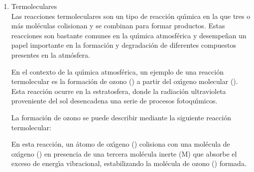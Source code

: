 \begin{enumerate}
La reacci\'on de segundo orden entre los \'oxidos de nitr\'ogeno y el ozono es importante en la qu\'{\i}mica atmosf\'erica, ya que contribuye a la formaci\'on de oxidantes fotoqu\'{\i}micos, como el di\'oxido de nitr\'ogeno (), que puede tener efectos adversos en la salud humana y en el  ambiente.

 \begin{equation*}
	-\frac{\mathrm{d}[\textrm{A}]}{\mathrm{d}t}=-\frac{\mathrm{d}[\textrm{B}]}{\mathrm{d}t}=\frac{\mathrm{d}[\textrm{C}]}{\mathrm{d}t}=k[\textrm{A}][\textrm{B}]
	\end{equation*}
	las unidades de k son \si{\centi\cubic\metre}/{molec$\cdot $\si{\second}}
	
En resumen, las reacciones de segundo orden son aquellas en las que la velocidad de reacci\'on depende de la concentraci\'on de dos reactivos diferentes. En el caso de la qu\'{\i}mica atmosf\'erica, un ejemplo de una reacci\'on de segundo orden es la reacci\'on entre los \'oxidos de nitr\'ogeno y el ozono. La velocidad de reacci\'on est\'a determinada por el producto de las concentraciones de ambos reactivos y desempe\~na un papel importante en la formaci\'on de contaminantes atmosf\'ericos como el smog fotoqu\'{\i}mico.

\item Termoleculares \\
Las reacciones termoleculares son un tipo de reacci\'on qu\'{\i}mica en la que tres o m\'as mol\'eculas colisionan y se combinan para formar productos. Estas reacciones son bastante comunes en la qu\'{\i}mica atmosf\'erica y desempe\~nan un papel importante en la formaci\'on y degradaci\'on de diferentes compuestos presentes en la atm\'osfera.

En el contexto de la qu\'{\i}mica atmosf\'erica, un ejemplo de una reacci\'on termolecular es la formaci\'on de ozono () a partir del ox\'{\i}geno molecular (). Esta reacci\'on ocurre en la estratosfera, donde la radiaci\'on ultravioleta proveniente del sol desencadena una serie de procesos fotoqu\'{\i}micos.

La formaci\'on de ozono se puede describir mediante la siguiente reacci\'on termolecular:


En esta reacci\'on, un \'atomo de ox\'{\i}geno () colisiona con una mol\'ecula de ox\'{\i}geno () en presencia de una tercera mol\'ecula inerte (M) que absorbe el exceso de energ\'{\i}a vibracional, estabilizando la mol\'ecula de ozono () formada.


\end{enumerate}
